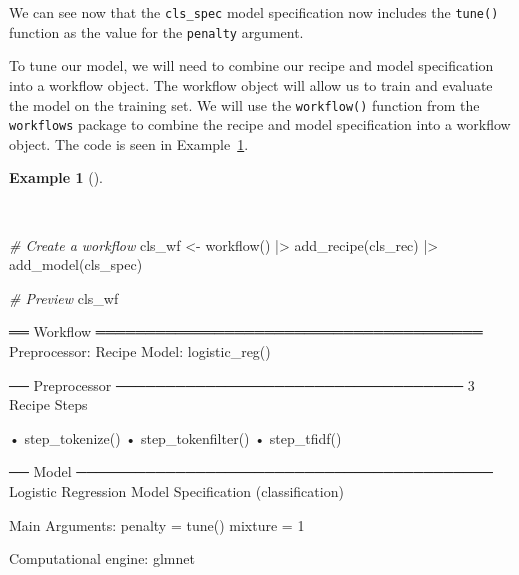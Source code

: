 \documentclass[
  letterpaper,
]{latex/krantz}
\newenvironment{Shaded}{\begin{snugshade}}{\end{snugshade}}
\newcommand{\CommentTok}[1]{\textcolor[rgb]{0.00,0.00,0.00}{\textit{#1}}}
\newcommand{\FunctionTok}[1]{\textcolor[rgb]{0.00,0.00,0.00}{#1}}
\newcommand{\NormalTok}[1]{\textcolor[rgb]{0.00,0.00,0.00}{#1}}
\newcommand{\OtherTok}[1]{\textcolor[rgb]{0.00,0.00,0.00}{#1}}
\newcommand{\SpecialCharTok}[1]{\textcolor[rgb]{0.00,0.00,0.00}{#1}}
\theoremstyle{definition}
\newtheorem{example}{Example}[chapter]
\theoremstyle{remark}
\begin{document}
We can see now that the \texttt{cls\_spec} model specification now
includes the \texttt{tune()} function as the value for the
\texttt{penalty} argument.

To tune our model, we will need to combine our recipe and model
specification into a workflow object. The workflow object will allow us
to train and evaluate the model on the training set. We will use the
\texttt{workflow()} function from the \texttt{workflows} package to
combine the recipe and model specification into a workflow object. The
code is seen in Example~\ref{exm-pda-class-workflow}.

\begin{example}[]\protect\hypertarget{exm-pda-class-workflow}{}\label{exm-pda-class-workflow}

~

\begin{Shaded}
\begin{Highlighting}[]
\CommentTok{\# Create a workflow}
\NormalTok{cls\_wf }\OtherTok{\textless{}{-}}
  \FunctionTok{workflow}\NormalTok{() }\SpecialCharTok{|\textgreater{}}
  \FunctionTok{add\_recipe}\NormalTok{(cls\_rec) }\SpecialCharTok{|\textgreater{}}
  \FunctionTok{add\_model}\NormalTok{(cls\_spec)}

\CommentTok{\# Preview}
\NormalTok{cls\_wf}
\end{Highlighting}
\end{Shaded}

\begin{Shaded}
\begin{Highlighting}[]
\NormalTok{══ Workflow ═══════════════════════════════════════}
\NormalTok{Preprocessor: Recipe}
\NormalTok{Model: logistic\_reg()}

\NormalTok{── Preprocessor ───────────────────────────────────}
\NormalTok{3 Recipe Steps}

\NormalTok{• step\_tokenize()}
\NormalTok{• step\_tokenfilter()}
\NormalTok{• step\_tfidf()}

\NormalTok{── Model ──────────────────────────────────────────}
\NormalTok{Logistic Regression Model Specification (classification)}

\NormalTok{Main Arguments:}
\NormalTok{  penalty = tune()}
\NormalTok{  mixture = 1}

\NormalTok{Computational engine: glmnet}
\end{Highlighting}
\end{Shaded}

\end{example}
\end{document}

